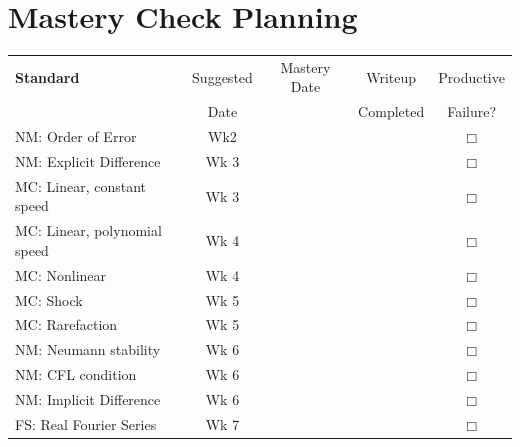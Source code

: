 \documentclass{article}
\begin{document}
\section{Mastery Check Planning}
\begin{tabular}{|l|c|c|c|c} \cline{1-4}
\textbf{Standard} & Suggested & Mastery Date & Writeup & Productive  \\ 
& Date & & Completed & Failure? \\ \cline{1-4}
\multirow{2}{5cm}{NM: Order of Error} & \multirow{2}{1.5cm}{Wk2} &&& \multirow{2}{.4cm}{$\Box$} \\ &&&& \\ \cline{1-4}
\multirow{2}{5cm}{NM: Explicit Difference} & \multirow{2}{1.5cm}{Wk 3} &&& \multirow{2}{.4cm}{$\Box$} \\ &&&& \\ \cline{1-4}
\multirow{2}{5cm}{MC: Linear, constant speed}  & \multirow{2}{1.5cm}{Wk 3}&&& \multirow{2}{.4cm}{$\Box$} \\ &&&& \\ \cline{1-4}
\multirow{2}{5cm}{MC: Linear, polynomial speed} & \multirow{2}{1.5cm}{Wk 4}&&& \multirow{2}{.4cm}{$\Box$} \\ &&&& \\ \cline{1-4}
\multirow{2}{5cm}{MC: Nonlinear} &\multirow{2}{1.5cm}{Wk 4}&&& \multirow{2}{.4cm}{$\Box$} \\ &&&& \\ \cline{1-4}
\multirow{2}{5cm}{MC: Shock} &\multirow{2}{1.5cm}{Wk 5}&&& \multirow{2}{.4cm}{$\Box$} \\ &&&& \\ \cline{1-4}
\multirow{2}{5cm}{MC: Rarefaction} & \multirow{2}{1.5cm}{Wk 5}&&& \multirow{2}{.4cm}{$\Box$} \\ &&&& \\ \cline{1-4}
\multirow{2}{5cm}{NM: Neumann stability} &\multirow{2}{1.5cm}{Wk 6}&&& \multirow{2}{.4cm}{$\Box$} \\ &&&& \\ \cline{1-4}
\multirow{2}{5cm}{NM: CFL condition} &\multirow{2}{1.5cm}{Wk 6}&&& \multirow{2}{.4cm}{$\Box$} \\ &&&& \\ \cline{1-4}
\multirow{2}{5cm}{NM: Implicit Difference} &\multirow{2}{1.5cm}{Wk 6}&&& \multirow{2}{.4cm}{$\Box$} \\ &&&& \\ \cline{1-4}
\multirow{2}{5cm}{FS: Real Fourier Series} & \multirow{2}{1.5cm}{Wk 7} &&& \multirow{2}{.4cm}{$\Box$} \\ &&&& \\ \cline{1-4}

\end{tabular}
\end{document}
